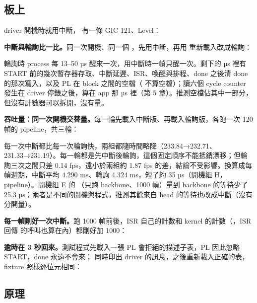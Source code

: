 \subsection{板上}

driver 開機時就用中斷， 有一條 GIC 121、Level：


\textbf{中斷與輪詢比一比。}同一次開機、同一個 ，先用中斷，再用  重新載入改成輪詢：


輪詢時 process 每 13--50 µs 醒來一次，用中斷時一幀只醒一次。剩下的 \irqWaitUs{} µs 裡有 START 前的幾次暫存器存取、中斷延遲、ISR、喚醒與排程、done 之後清 done 的那次寫入，以及 PL 在 block 之間的空檔（ 不算空檔）；讀六個 cycle counter 發生在 driver 停錶之後，算在 app 那 \bbSysUs{} µs 裡（第 5 章）。推測空檔佔其中一部分，但沒有計數器可以拆開，沒有量。

\textbf{吞吐量：同一次開機交替量。}每一輪先載入中斷版、再載入輪詢版，各跑一次 120 幀的 pipeline，共三輪：


每一次中斷都比每一次輪詢快，兩組都隨時間略降（233.84→232.71、231.33→231.19）。每一輪都是先中斷後輪詢，這個固定順序不能抵銷漂移；但輪詢三次之間只差 0.14 fps，遠小於兩組約 1.87 fps 的差，結論不受影響。換算成每幀週期，中斷平均 4.290 ms、輪詢 4.324 ms，短了約 35 µs（開機組 H，pipeline）。開機組 E 的 （只跑 backbone、1000 幀）量到 backbone 的等待少了 25.3 µs；兩者是不同的開機與程式，推測其餘來自 head 的等待也改成中斷（沒有分開量）。

\textbf{每一幀剛好一次中斷。}跑 1000 幀前後，ISR 自己的計數和 kernel 的計數（，ISR 回傳  的呼叫也算在內）都剛好加 1000：


\textbf{逾時在 3 秒回來。}測試程式先載入一張 PL 會拒絕的描述子表，PL 因此忽略 START，done 永遠不會來； 同時印出 driver 的訊息，之後重新載入正確的表，fixture 照樣逐位元相同：


\subsection{原理}

